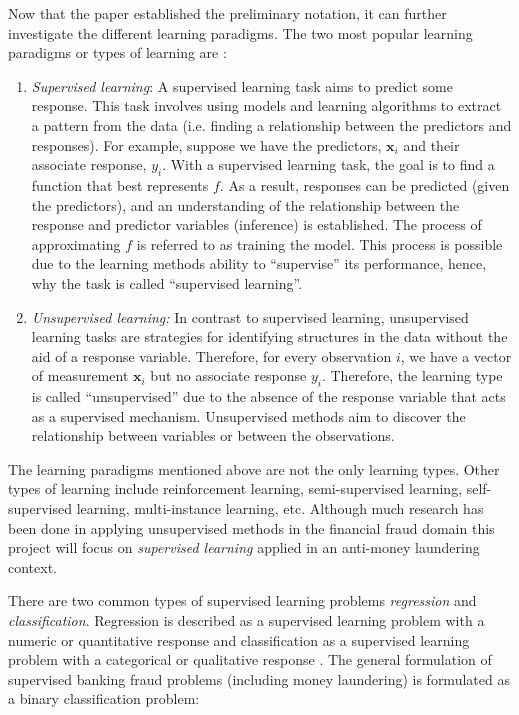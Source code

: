 Now that the paper established the preliminary notation, it can further investigate the different learning paradigms. The two most popular learning paradigms or types of learning are \citep{abu2012learning,et2020pien, james2013introduction}:

\begin{enumerate}
    \item \textit{Supervised learning}: A supervised learning task aims to predict some response. This task involves using models and learning algorithms to extract a pattern from the data (i.e. finding a relationship between the predictors and responses). For example, suppose we have the predictors, $\boldsymbol{x}_i$ and their associate response, ${y}_i$. With a supervised learning task, the goal is to find a function that best represents $f$. As a result, responses can be predicted (given the predictors), and an understanding of the relationship between the response and predictor variables (inference) is established.  The process of approximating $f$ is referred to as training the model. This process is possible due to the learning methods ability to ``supervise'' its performance, hence, why the task is called ``supervised learning''.
    
    \item \textit{Unsupervised learning:} In contrast to supervised learning, unsupervised learning tasks are strategies for identifying structures in the data without the aid of a response variable. Therefore, for every observation $i$, we have a vector of measurement $\boldsymbol{x}_i$ but no associate response $y_i$. Therefore, the learning type is called ``unsupervised'' due to the absence of the response variable that acts as a supervised mechanism. Unsupervised methods aim to discover the relationship between variables or between the observations.
    
\end{enumerate}

The learning paradigms mentioned above are not the only learning types. Other types of learning include reinforcement learning, semi-supervised learning, self-supervised learning, multi-instance learning, etc. Although much research has been done in applying unsupervised methods in the financial fraud domain \citep*{al2021financial, salehi2017data, abdallah2016fraud} this project will focus on \textit{supervised learning} applied in an anti-money laundering context. 

There are two common types of supervised learning problems \textit{regression} and \textit{classification}. Regression is described as a supervised learning problem with a numeric or quantitative response and classification as a supervised learning problem with a categorical or qualitative response \citep*{james2013introduction}. The general formulation of supervised banking fraud problems (including money laundering) is formulated as a binary classification problem:

